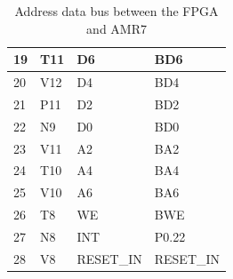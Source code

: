 \begin{table}[H]
\begin{tabular}{|p{3cm}|p{3cm}|p{3cm}|p{3cm}|}
        19          & T11          & D6               & BD6               \\ \hline
        20          & V12          & D4               & BD4               \\ \hline
        21          & P11          & D2               & BD2               \\ \hline
        22          & N9           & D0               & BD0               \\ \hline
        23          & V11          & A2               & BA2               \\ \hline
        24          & T10          & A4               & BA4               \\ \hline
        25          & V10          & A6               & BA6               \\ \hline
        26          & T8           & WE               & BWE               \\ \hline
        27          & N8           & INT              & P0.22             \\ \hline
        28          & V8           & RESET\_IN        & RESET\_IN         \\
        \hline
    \end{tabular}
    \caption{Address data bus between the FPGA and AMR7}
\end{table}